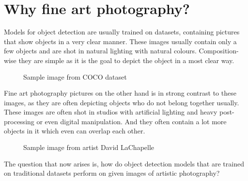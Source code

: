 \section{Why fine art photography?}
Models for object detection are usually trained on datasets, containing pictures that show objects in a very clear manner. These images usually contain only a few objects and are shot in natural lighting with natural colours. Composition-wise they are simple as it is the goal to depict the object in a most clear way.

\begin{figure}[H]
	\caption{\label{fig:coco-sample} Sample image from COCO dataset}
\end{figure}

Fine art photography pictures on the other hand is in strong contrast to these images, as they are often depicting objects who do not belong together usually. These images are often shot in studios with artificial lighting and heavy post-processing or even digital manipulation. And they often contain a lot more objects in it which even can overlap each other.

\begin{figure}[H]
	\caption{\label{fig:dl_rapeofafrica} Sample image from artist David LaChapelle}
\end{figure}

The question that now arises is, how do object detection models that are trained on traditional datasets perform on given images of artistic photography?